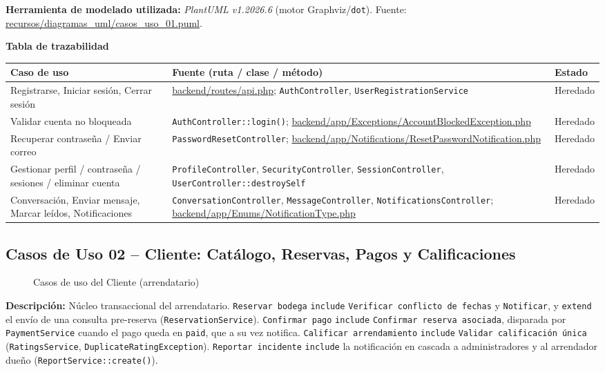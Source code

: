 \bigskip
{\sloppy\noindent\textbf{Herramienta de modelado utilizada:} \textit{PlantUML v1.2026.6} (motor Graphviz/\texttt{dot}). Fuente: \url{recursos/diagramas_uml/casos_uso_01.puml}.\par}

\bigskip
\noindent\textbf{Tabla de trazabilidad}
\begin{longtable}{|L{5cm}|L{7.5cm}|M{2cm}|}
\hline
{} \textbf{Caso de uso} & \textbf{Fuente (ruta / clase / método)} & \textbf{Estado} \\ \hline
\endhead
Registrarse, Iniciar sesión, Cerrar sesión & \url{backend/routes/api.php}; \texttt{AuthController}, \texttt{UserRegistrationService} & Heredado \\ \hline
Validar cuenta no bloqueada & \texttt{AuthController::login()}; \url{backend/app/Exceptions/AccountBlockedException.php} & Heredado \\ \hline
Recuperar contraseña / Enviar correo & \texttt{PasswordResetController}; \url{backend/app/Notifications/ResetPasswordNotification.php} & Heredado \\ \hline
Gestionar perfil / contraseña / sesiones / eliminar cuenta & \texttt{ProfileController}, \texttt{SecurityController}, \texttt{SessionController}, \texttt{UserController::destroySelf} & Heredado \\ \hline
Conversación, Enviar mensaje, Marcar leídos, Notificaciones & \texttt{ConversationController}, \texttt{MessageController}, \texttt{NotificationsController}; \url{backend/app/Enums/NotificationType.php} & Heredado \\ \hline
\end{longtable}
\clearpage

\subsection{Casos de Uso 02 -- Cliente: Catálogo, Reservas, Pagos y Calificaciones}
\begin{figure}[H]
    \centering
    \caption{Casos de uso del Cliente (arrendatario)}
    \label{fig:cu02}
\end{figure}
\noindent\textbf{Descripción:} Núcleo transaccional del arrendatario. \texttt{Reservar bodega} \texttt{\guillemotleft include\guillemotright} \texttt{Verificar conflicto de fechas} y \texttt{Notificar}, y \texttt{\guillemotleft extend\guillemotright} el envío de una consulta pre-reserva (\texttt{ReservationService}). \texttt{Confirmar pago} \texttt{\guillemotleft include\guillemotright} \texttt{Confirmar reserva asociada}, disparada por \texttt{PaymentService} cuando el pago queda en \texttt{paid}, que a su vez notifica. \texttt{Calificar arrendamiento} \texttt{\guillemotleft include\guillemotright} \texttt{Validar calificación única} (\texttt{RatingsService}, \texttt{DuplicateRatingException}). \texttt{Reportar incidente} \texttt{\guillemotleft include\guillemotright} la notificación en cascada a administradores y al arrendador dueño (\texttt{ReportService::create()}).


